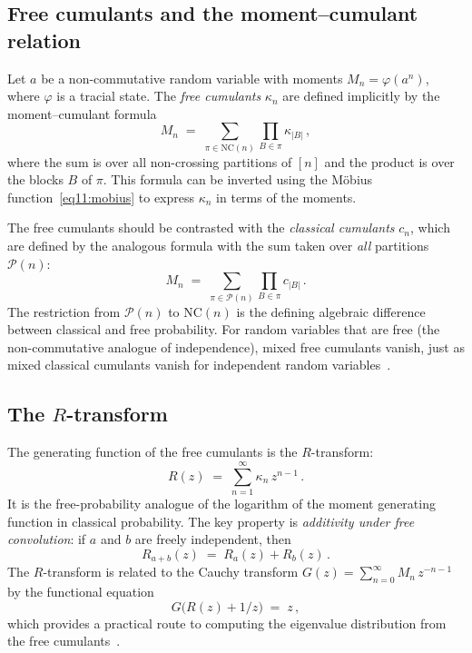 \documentclass[11pt,letterpaper]{article}
\theoremstyle{plain}
\theoremstyle{definition}
\theoremstyle{remark}
\begin{document}
\subsection{Free cumulants and the moment--cumulant relation}
\label{subsec11:free_cumulants}

Let $a$ be a non-commutative random variable with moments
$M_n = \varphi(a^n)$, where $\varphi$ is a tracial state.  The
\emph{free cumulants} $\kappa_n$ are defined implicitly by the
moment--cumulant formula
\begin{equation}
\label{eq11:moment_cumulant}
  M_n
  \;=\;
  \sum_{\pi \in \mathrm{NC}(n)}
  \prod_{B \in \pi} \kappa_{|B|}\,,
\end{equation}
where the sum is over all non-crossing partitions of $[n]$ and the
product is over the blocks $B$ of $\pi$.  This formula can be inverted
using the M\"obius function~\eqref{eq11:mobius} to express $\kappa_n$ in
terms of the moments.

The free cumulants should be contrasted with the \emph{classical
cumulants} $c_n$, which are defined by the analogous formula with the
sum taken over \emph{all} partitions $\mathcal{P}(n)$:
\begin{equation}
\label{eq11:classical_cumulant}
  M_n
  \;=\;
  \sum_{\pi \in \mathcal{P}(n)}
  \prod_{B \in \pi} c_{|B|}\,.
\end{equation}
The restriction from $\mathcal{P}(n)$ to $\mathrm{NC}(n)$ is the
defining algebraic difference between classical and free probability.
For random variables that are free (the non-commutative analogue of
independence), mixed free cumulants vanish, just as mixed classical
cumulants vanish for independent random variables~\cite{nicaspeicher2006}.

\subsection{The \texorpdfstring{$R$}{R}-transform}
\label{subsec11:r_transform}

The generating function of the free cumulants is the $R$-transform:
\begin{equation}
\label{eq11:r_transform}
  R(z)
  \;=\;
  \sum_{n=1}^{\infty} \kappa_n\, z^{n-1}\,.
\end{equation}
It is the free-probability analogue of the logarithm of the moment
generating function in classical probability.  The key property is
\emph{additivity under free convolution}: if $a$ and $b$ are freely
independent, then
\begin{equation}
\label{eq11:r_additivity}
  R_{a+b}(z)
  \;=\;
  R_a(z) + R_b(z)\,.
\end{equation}
The $R$-transform is related to the Cauchy transform
$G(z) = \sum_{n=0}^{\infty} M_n\, z^{-n-1}$ by the functional equation
\begin{equation}
\label{eq11:r_cauchy}
  G\!\bigl(R(z) + 1/z\bigr) \;=\; z\,,
\end{equation}
which provides a practical route to computing the eigenvalue
distribution from the free cumulants~\cite{voiculescu1991}.
\end{document}

